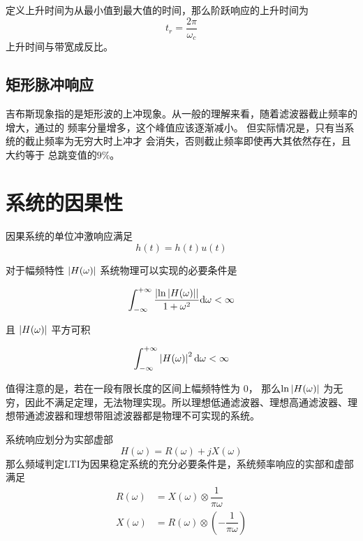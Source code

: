 \documentclass[cn,11pt,chinese,black,simple]{../elegantbook}
\begin{document}
定义上升时间为从最小值到最大值的时间，那么阶跃响应的上升时间为 \[t_r = \dfrac{2 \pi }{\omega_c}\] 上升时间与带宽成反比。


\subsection{矩形脉冲响应}

吉布斯现象指的是矩形波的上冲现象。从一般的理解来看，随着滤波器截止频率的增大，通过的
频率分量增多，这个峰值应该逐渐减小。
但实际情况是，只有当系统的截止频率为无穷大时上冲才
会消失，否则截止频率即使再大其依然存在，且大约等于
总跳变值的\(9 \% \)。

\section{系统的因果性}

因果系统的单位冲激响应满足\[h(t)  = h(t) u(t)\]

\begin{theorem}[佩利-维纳准则]
对于幅频特性 \(\left| H(\omega) \right|\) 系统物理可以实现的必要条件是 

\[\int_{-\infty}^{+\infty} \dfrac{\left| \ln \left| H(\omega) \right| \right|}{1 + \omega^2} \mathrm{d}\omega < \infty\]

且 \(\left| H(\omega) \right|\) 平方可积

\[\int_{-\infty}^{+\infty} \left| H(\omega) \right|^2 \mathrm{d}\omega < \infty\]

\end{theorem}

值得注意的是，若在一段有限长度的区间上幅频特性为  \(0\)， 那么\(\ln \left| H(\omega) \right|\) 为无穷，因此不满足定理，无法物理实现。所以理想低通滤波器、理想高通滤波器、理想带通滤波器和理想带阻滤波器都是物理不可实现的系统。


\begin{theorem}[希尔伯特变换]
    系统响应划分为实部虚部
    \[H(\omega) = R(\omega) + j X(\omega)\]
    那么频域判定LTI为因果稳定系统的充分必要条件是，系统频率响应的实部和虚部满足
    \begin{equation*}
        \begin{aligned}
            R(\omega) &= X(\omega) \otimes \dfrac{1}{\pi \omega}\\
            X(\omega) &= R(\omega) \otimes (- \dfrac{1}{\pi \omega})\\
        \end{aligned}
    \end{equation*}
\end{theorem}
\end{document}
